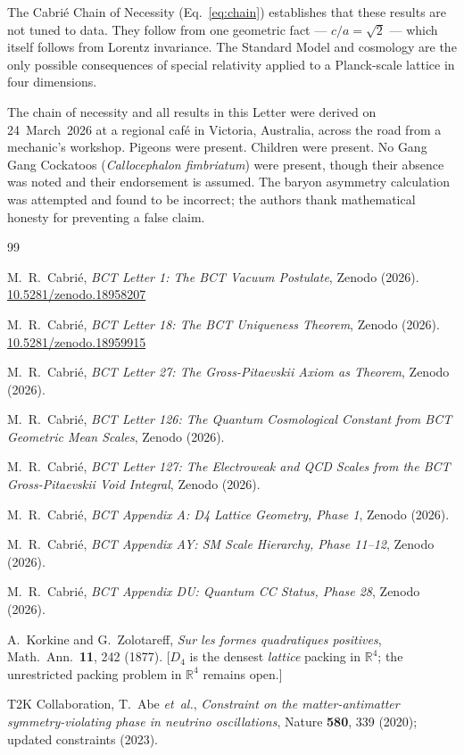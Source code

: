 \documentclass[aps,prl,twocolumn,showpacs,preprintnumbers]{revtex4-2}
\begin{document}
The Cabri\'e Chain of Necessity (Eq.~\eqref{eq:chain}) establishes
that these results are not tuned to data. They follow from one
geometric fact --- $c/a = \sqrt{2}$ --- which itself follows from
Lorentz invariance. The Standard Model and cosmology are the
only possible consequences of special relativity applied to a
Planck-scale lattice in four dimensions.

\begin{acknowledgments}
The chain of necessity and all results in this Letter were derived
on 24~March~2026 at a regional caf\'e in Victoria, Australia,
across the road from a mechanic's workshop.
Pigeons were present. Children were present.
No Gang Gang Cockatoos (\textit{Callocephalon fimbriatum})
were present, though their absence was noted and their
endorsement is assumed.
The baryon asymmetry calculation was attempted and found to be
incorrect; the authors thank mathematical honesty for preventing
a false claim.
\end{acknowledgments}

\begin{thebibliography}{99}

M.~R.~Cabri\'e, \textit{BCT Letter 1: The BCT Vacuum Postulate},
Zenodo (2026). \href{https://zenodo.org}{10.5281/zenodo.18958207}

M.~R.~Cabri\'e, \textit{BCT Letter 18: The BCT Uniqueness Theorem},
Zenodo (2026). \href{https://zenodo.org}{10.5281/zenodo.18959915}

M.~R.~Cabri\'e, \textit{BCT Letter 27: The Gross-Pitaevskii
Axiom as Theorem}, Zenodo (2026).

M.~R.~Cabri\'e, \textit{BCT Letter 126: The Quantum Cosmological
Constant from BCT Geometric Mean Scales}, Zenodo (2026).

M.~R.~Cabri\'e, \textit{BCT Letter 127: The Electroweak and QCD
Scales from the BCT Gross-Pitaevskii Void Integral},
Zenodo (2026).

M.~R.~Cabri\'e, \textit{BCT Appendix A: D4 Lattice Geometry,
Phase 1}, Zenodo (2026).

M.~R.~Cabri\'e, \textit{BCT Appendix AY: SM Scale Hierarchy,
Phase 11--12}, Zenodo (2026).

M.~R.~Cabri\'e, \textit{BCT Appendix DU: Quantum CC Status,
Phase 28}, Zenodo (2026).

A.~Korkine and G.~Zolotareff,
\textit{Sur les formes quadratiques positives},
Math.\ Ann.\ \textbf{11}, 242 (1877).
[$D_4$ is the densest \emph{lattice} packing in $\mathbb{R}^4$;
the unrestricted packing problem in $\mathbb{R}^4$ remains open.]


T2K Collaboration, T.~Abe \textit{et~al.},
\textit{Constraint on the matter-antimatter symmetry-violating
phase in neutrino oscillations},
Nature \textbf{580}, 339 (2020); updated constraints (2023).

\end{thebibliography}
\end{document}
